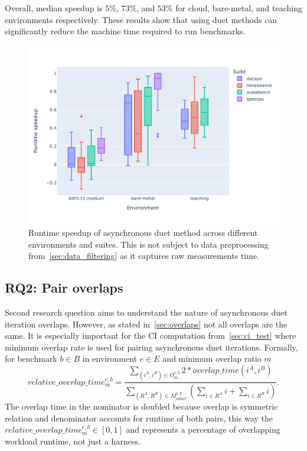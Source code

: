 Overall, median speedup is $5\%$, $73\%$, and $53\%$ for cloud, bare-metal, and teaching environments respectively.
These results show that using duet methods can significantly reduce the machine time required to run benchmarks.

\begin{figure}
	\centering
	\includegraphics[width=.9\linewidth]{./figures/runtime_speedup.pdf}
	\caption{
		Runtime speedup of asynchronous duet method across different environments and suites.
		This is not subject to data preprocessing from~\cref{sec:data_filtering} as it captures raw measurements time.
	}
	\label{fig:runtime_speedup}
\end{figure}

\subsection{RQ2: Pair overlaps}
\label{sec:rq2}

Second research question aims to understand the nature of asynchronous duet iteration overlaps.
However, as stated in~\cref{sec:overlaps} not all overlaps are the same.
It is especially important for the CI computation from~\ref{sec:ci_test} where minimum overlap rate is used for pairing asynchronous duet iterations.
Formally, for benchmark $b \in B$ in environment $e \in E$ and minimum overlap ratio $m$
$$
relative\_overlap\_time^{e, b}_m = \frac{\sum\limits_{(i^A, i^B) \in O^{e,b}_m} 2 * overlap\_time(i^A, i^B)}{\sum\limits_{(R^A, R^B) \in M^{e, b}_{aduet}}(\sum\limits_{i \in R^A} i + \sum\limits_{i \in R^B} i)}.
$$
The overlap time in the nominator is doubled because overlap is symmetric relation and denominator accounts for runtime of both pairs, this way the $relative\_overlap\_time^{e, b}_m \in [0, 1]$ and represents a percentage of overlapping workload runtime, not just a harness.


